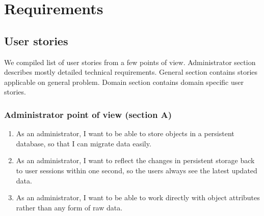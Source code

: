 \chapter{Requirements}
\section{User stories}
We compiled list of user stories from a few points of view. Administrator section describes mostly detailed technical requirements. General section contains stories applicable on general problem. Domain section contains domain specific user stories.

\subsection{Administrator point of view (section A)}
\begin{enumerate}
  \item As an administrator, I want to be able to store objects in a persistent database, so that I can migrate data easily.
  \item As an administrator, I want to reflect the changes in persistent storage back to user sessions within one second, so the users always see the latest updated data.
  \item As an administrator, I want to be able to work directly with object attributes rather than any form of raw data.
\end{enumerate}

